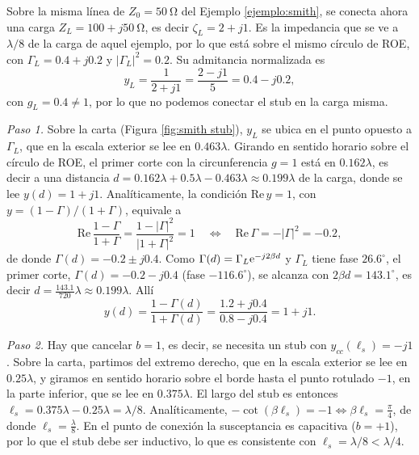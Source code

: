 \begin{ejemplo}\label{ejemplo:stub}
Sobre la misma línea de $Z_0=50\ \unit{\ohm}$ del Ejemplo \ref{ejemplo:smith}, se conecta ahora una carga $Z_L=100+j50\ \unit{\ohm}$, es decir $\zeta_L=2+j1$. Es la impedancia que se ve a $\lambda/8$ de la carga de aquel ejemplo, por lo que está sobre el mismo círculo de ROE, con $\Gamma_L=0.4+j0.2$ y $|\Gamma_L|^2=0.2$. Su admitancia normalizada es
\begin{equation*}
    y_L = \frac{1}{2+j1} = \frac{2-j1}{5} = 0.4-j0.2,
\end{equation*}
con $g_L=0.4\neq 1$, por lo que no podemos conectar el stub en la carga misma.

\emph{Paso 1.} Sobre la carta (Figura \ref{fig:smith stub}), $y_L$ se ubica en el punto opuesto a $\Gamma_L$, que en la escala exterior se lee en $0.463\lambda$. Girando en sentido horario sobre el círculo de ROE, el primer corte con la circunferencia $g=1$ está en $0.162\lambda$, es decir a una distancia $d=0.162\lambda+0.5\lambda-0.463\lambda\approx 0.199\lambda$ de la carga, donde se lee $y(d)=1+j1$. Analíticamente, la condición $\mathrm{Re}\,y=1$, con $y=(1-\Gamma)/(1+\Gamma)$, equivale a
\begin{equation*}
    \mathrm{Re}\,\frac{1-\Gamma}{1+\Gamma} = \frac{1-|\Gamma|^2}{|1+\Gamma|^2} = 1 \quad\Longleftrightarrow\quad \mathrm{Re}\,\Gamma = -|\Gamma|^2 = -0.2,
\end{equation*}
de donde $\Gamma(d)=-0.2\pm j0.4$. Como $\Gamma(d)=\Gamma_L\mathrm{e}^{-j2\beta d}$ y $\Gamma_L$ tiene fase $26.6^\circ$, el primer corte, $\Gamma(d)=-0.2-j0.4$ (fase $-116.6^\circ$), se alcanza con $2\beta d=143.1^\circ$, es decir $d=\frac{143.1}{720}\lambda\approx 0.199\lambda$. Allí
\begin{equation*}
    y(d) = \frac{1-\Gamma(d)}{1+\Gamma(d)} = \frac{1.2+j0.4}{0.8-j0.4} = 1+j1.
\end{equation*}

\emph{Paso 2.} Hay que cancelar $b=1$, es decir, se necesita un stub con $y_{cc}(\ell_s)=-j1$. Sobre la carta, partimos del extremo derecho, que en la escala exterior se lee en $0.25\lambda$, y giramos en sentido horario sobre el borde hasta el punto rotulado $-1$, en la parte inferior, que se lee en $0.375\lambda$. El largo del stub es entonces $\ell_s=0.375\lambda-0.25\lambda=\lambda/8$. Analíticamente, $-\cot(\beta\ell_s)=-1 \Leftrightarrow \beta\ell_s = \frac{\pi}{4}$, de donde $\ell_s=\frac{\lambda}{8}$. En el punto de conexión la susceptancia es capacitiva ($b=+1$), por lo que el stub debe ser inductivo, lo que es consistente con $\ell_s=\lambda/8<\lambda/4$.


\end{ejemplo}
